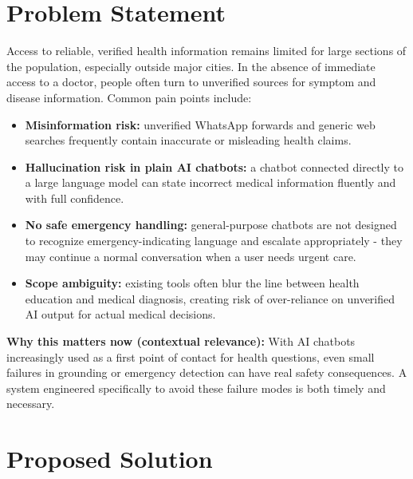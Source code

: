 \documentclass[11pt,a4paper]{article}
\begin{document}
\section{Problem Statement}
Access to reliable, verified health information remains limited for large sections of the population, especially outside major cities. In the absence of immediate access to a doctor, people often turn to unverified sources for symptom and disease information. Common pain points include:
\begin{itemize}
    \item \textbf{Misinformation risk:} unverified WhatsApp forwards and generic web searches frequently contain inaccurate or misleading health claims.
    \item \textbf{Hallucination risk in plain AI chatbots:} a chatbot connected directly to a large language model can state incorrect medical information fluently and with full confidence.
    \item \textbf{No safe emergency handling:} general-purpose chatbots are not designed to recognize emergency-indicating language and escalate appropriately - they may continue a normal conversation when a user needs urgent care.
    \item \textbf{Scope ambiguity:} existing tools often blur the line between health education and medical diagnosis, creating risk of over-reliance on unverified AI output for actual medical decisions.
\end{itemize}

\noindent\textbf{Why this matters now (contextual relevance):} With AI chatbots increasingly used as a first point of contact for health questions, even small failures in grounding or emergency detection can have real safety consequences. A system engineered specifically to avoid these failure modes is both timely and necessary.

\section{Proposed Solution}
\end{document}

